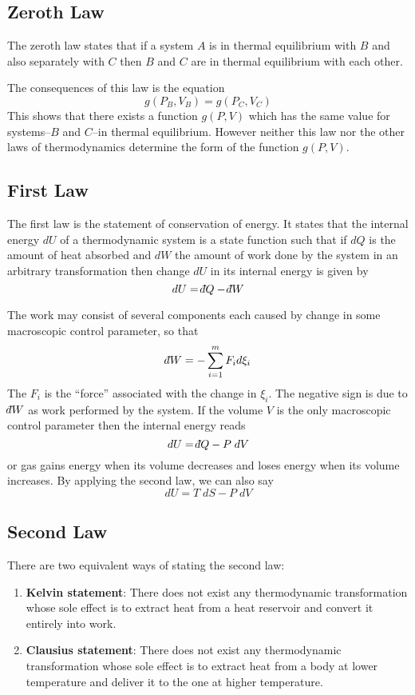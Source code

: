 \documentclass[../../../Main.tex]{subfiles}
\begin{document}
\subsection*{Zeroth Law}
The zeroth law states that if a system $A$ is in thermal equilibrium with $B$ and also separately with $C$ then $B$ and $C$ are in thermal equilibrium with each other. 

The consequences of this law is the equation
\begin{equation*}
    g(P_B , V_B ) = g(P_C , V_C )
\end{equation*}
This shows that there exists a function $g(P, V )$ which has the same value for systems--$B$ and $C$--in thermal equilibrium. However neither this law nor the other laws of thermodynamics determine the form of the function $g(P, V )$.

\subsection*{First Law}
The first law is the statement of conservation of energy. It states that the internal energy $dU$ of a thermodynamic system is a state function such that if $d Q$ is the amount of heat absorbed and $d W $ the amount of work done by the system in an arbitrary transformation then change $d U$ in its internal energy is given by
\begin{equation*}
    d U=\dbar Q- \dbar W
\end{equation*}

The work may consist of several components each caused by change in some macroscopic control parameter, so that
\begin{equation*}
    \dbar W=-\sum_{i=1}^{m}F_id\xi_i
\end{equation*}
The $F_i$ is the “force” associated with the change in $\xi_i$. The negative sign is due to $\dbar W$ as work performed by the system. If the volume $V$ is the only macroscopic control parameter then the internal energy reads
\begin{equation*}
    dU=\dbar Q-P\;dV
\end{equation*}
or gas gains energy when its volume decreases and loses energy when its volume increases. By applying the second law, we can also say 
\begin{equation*}
    dU=T\;dS-P\;dV
\end{equation*}

\subsection*{Second Law}
There are two equivalent ways of stating the second law:
\begin{enumerate}
    \item \textbf{Kelvin statement}: There does not exist any thermodynamic transformation whose sole effect is to extract heat from a heat reservoir and convert it entirely into work.
    \item \textbf{Clausius statement}: There does not exist any thermodynamic transformation whose sole effect is to extract heat from a body at lower temperature and deliver it to the one at higher temperature.
\end{enumerate}
\end{document}
